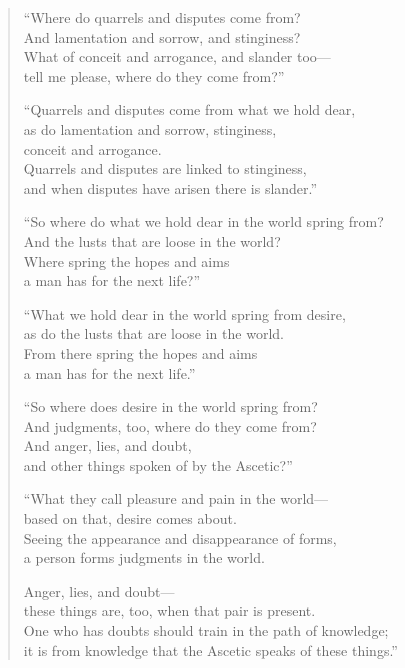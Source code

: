 \documentclass[12pt,openany]{book}%
\begin{document}
\begin{verse}%
“Where do quarrels and disputes come from? \\
And lamentation and sorrow, and stinginess? \\
What of conceit and arrogance, and slander too—\\
tell me please, where do they come from?” 

“Quarrels and disputes come from what we hold dear, \\
as do lamentation and sorrow, stinginess, \\
conceit and arrogance. \\
Quarrels and disputes are linked to stinginess, \\
and when disputes have arisen there is slander.” 

“So where do what we hold dear in the world spring from? \\
And the lusts that are loose in the world? \\
Where spring the hopes and aims \\
a man has for the next life?” 

“What we hold dear in the world spring from desire, \\
as do the lusts that are loose in the world. \\
From there spring the hopes and aims \\
a man has for the next life.” 

“So where does desire in the world spring from? \\
And judgments, too, where do they come from? \\
And anger, lies, and doubt, \\
and other things spoken of by the Ascetic?” 

“What they call pleasure and pain in the world—\\
based on that, desire comes about. \\
Seeing the appearance and disappearance of forms, \\
a person forms judgments in the world. 

Anger, lies, and doubt—\\
these things are, too, when that pair is present. \\
One who has doubts should train in the path of knowledge; \\
it is from knowledge that the Ascetic speaks of these things.” 


\end{verse}
\end{document}
